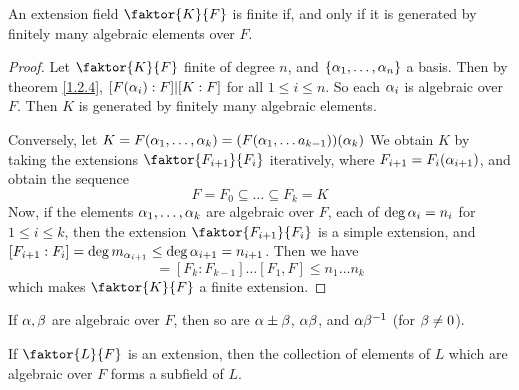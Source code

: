  \begin{theorem}\label{1.2.6}
     An extension field $\faktor{K}{F}$ is finite if, and only if it is
     generated by finitely many algebraic elements over $F$.
 \end{theorem}
 \begin{proof}
     Let $\faktor{K}{F}$ finite of degree $n$, and  $\{\alpha_1, \dots, \alpha_n\}$ a
     basis. Then by theorem \ref{1.2.4},  $[F(\alpha_i):F]|[K:F]$ for all $1 \leq i
     \leq n$. So each  $\alpha_i$ is algebraic over  $F$. Then  $K$ is generated by
     finitely many algebraic elements.

     Conversely, let $K=F(\alpha_1, \dots, \alpha_k)=(F(\alpha_1, \dots a_{k-1}))(\alpha_k)$ We
     obtain $K$ by taking the extensions $\faktor{F_{i+1}}{F_i}$ iteratively,
     where $F_{i+1}=F_i(\alpha_{i+1})$, and obtain the sequence
     \begin{equation*}
         F=F_0 \subseteq \dots \subseteq F_k=K
     \end{equation*}
     Now, if the elements $\alpha_1, \dots, \alpha_k$ are algebraic over $F$, each of
     $\deg{\alpha_i}=n_i$ for $1 \leq i \leq k$, then the extension
     $\faktor{F_{i+1}}{F_i}$ is a simple extension, and
     $[F_{i+1}:F_i]=\deg{m_{\alpha_{i+1}}} \leq \deg{\alpha_{i+1}}=n_{i+1}$. Then we
     have
     \begin{equation*}
         [K:F]=[F_k:F_{k-1}] \dots [F_1,F] \leq n_1 \dots n_k
     \end{equation*}
     which makes $\faktor{K}{F}$ a finite extension.
 \end{proof}
 \begin{corollary}
     If $\alpha,\beta$ are algebraic over $F$, then so are $\alpha \pm \beta$,  $\alpha\beta$, and
     $\alpha\beta^{-1}$ (for $\beta \neq 0$).
 \end{corollary}
 \begin{corollary}
     If $\faktor{L}{F}$ is an extension, then the collection of elements of $L$
     which are algebraic over  $F$ forms a subfield of  $L$.
 \end{corollary}

